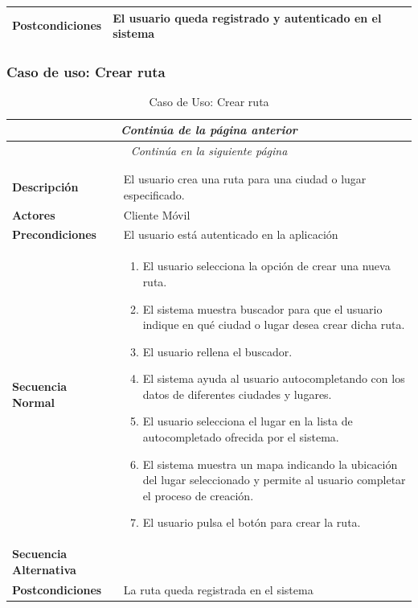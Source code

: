 \begin{longtable}{| p{4cm} | p{10cm} |}
\hline
\textbf{Postcondiciones} & 
El usuario queda registrado y autenticado en el sistema\\
\hline
\end{longtable}




\newpage
\subsubsection*{Caso de uso: Crear ruta}
\begin{longtable}{| p{4cm} | p{10cm} |}
\endfirsthead
\multicolumn{2}{c}{\textit{Continúa de la página anterior}}\\[12pt]
\hline
\endhead
\hline
\multicolumn{2}{c}{\textit{Continúa en la siguiente página}} \\
\endfoot
\hline
\caption{Caso de Uso: Crear ruta}\label{fig:1}\\
\endlastfoot


\hline
\multicolumn{2}{|c|}{\textbf{CU$<$03$>$ - Crear Ruta}} \\

\hline
\textbf{Descripción} &
El usuario crea una ruta para una ciudad o lugar especificado. \\

\hline
\textbf{Actores} &
Cliente Móvil\\

\hline
\textbf{Precondiciones} &
El usuario está autenticado en la aplicación\\

\hline
\textbf{Secuencia Normal} &\mbox{}\par\vspace{-\baselineskip}
\begin{enumerate}[leftmargin=0.7cm, topsep=0.1cm]
\item El usuario selecciona la opción de crear una nueva ruta.
\item El sistema muestra buscador para que el usuario indique en qué ciudad o lugar desea crear dicha ruta.
\item El usuario rellena el buscador.
\item El sistema ayuda al usuario autocompletando con los datos de diferentes ciudades y lugares.
\item El usuario selecciona el lugar en la lista de autocompletado ofrecida por el sistema.
\item El sistema muestra un mapa indicando la ubicación del lugar seleccionado y permite al usuario completar el proceso de creación.
\item El usuario pulsa el botón para crear la ruta.
\end{enumerate}\\

\hline
\textbf{Secuencia Alternativa} &\mbox{}\par\vspace{-\baselineskip}
\\

\hline
\textbf{Postcondiciones} & 
La ruta queda registrada en el sistema\\
\hline
\end{longtable}




